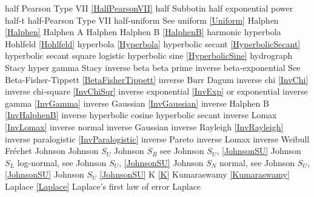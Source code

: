 half Pearson Type VII			\dotfill	\eqref{HalfPearsonVII} 				\ncite	%
half Subbotin					\dotfill	half exponential power				\ncite	%
half-t							\dotfill	half-Pearson Type VII				\ncite	%
half-uniform 					\dotfill	See uniform \eqref{Uniform} 			\ncite	%
Halphen							\dotfill	\eqref{Halphen}						\ncite
Halphen A						\dotfill	Halphen							\ncite
Halphen B						\dotfill	\eqref{HalphenB}					\ncite
harmonic						\dotfill	hyperbola							\ncite
Hohlfeld						\dotfill	\eqref{Hohlfeld}						\mcite{\self}	%
hyperbola						\dotfill	\eqref{Hyperbola}					\ncite	
hyperbolic secant 				\dotfill	\eqref{HyperbolicSecant}				\ncite	%
hyperbolic secant square		\dotfill	logistic 							\ncite	%
hyperbolic sine					\dotfill	\eqref{HyperbolicSine}				\mcite{\self}	%
hydrograph						\dotfill	Stacy 							\ncite	%
hyper gamma   					\dotfill	Stacy							\ncite	%
%
inverse beta					\dotfill	beta prime 						\ncite	%
inverse beta-exponential 		\dotfill	See Beta-Fisher-Tippett \eqref{BetaFisherTippett}\ncite
inverse Burr					\dotfill	Dagum 							\ncite	%
inverse chi  					\dotfill	\eqref{InvChi}						\ncite	%
inverse chi-square 				\dotfill	\eqref{InvChiSqr}					\ncite	%
inverse exponential 			\dotfill	\eqref{InvExp} or exponential			\ncite	%
inverse gamma 					\dotfill	\eqref{InvGamma}					\ncite	%
inverse Gaussian				\dotfill	\eqref{InvGaussian}					\ncite	%
inverse Halphen B				\dotfill	\eqref{InvHalphenB}					\ncite	
inverse hyperbolic cosine		\dotfill	hyperbolic secant 					\ncite	%
inverse Lomax					\dotfill	\eqref{InvLomax}					\ncite	%
inverse normal					\dotfill	inverse Gaussian					\ncite	%
inverse Rayleigh  				\dotfill	\eqref{InvRayleigh}					\ncite	%
inverse paralogistic			\dotfill	\eqref{InvParalogistic} 				\ncite	%
inverse Pareto					\dotfill	inverse Lomax 						\ncite 	%
inverse Weibull 				\dotfill	Fr\'{e}chet  						\ncite	%
%
Johnson							\dotfill	Johnson $S_U$								\ncite
Johnson $S_B$					\dotfill	see Johnson $S_U$, \eqref{JohnsonSU}	\ncite
Johnson $S_L$					\dotfill	log-normal, see Johnson $S_U$, \eqref{JohnsonSU}		\ncite
Johnson $S_N$					\dotfill	normal, see Johnson $S_U$, \eqref{JohnsonSU}			\ncite
Johnson $S_U$					\dotfill	\eqref{JohnsonSU}					\ncite
%
K								\dotfill	\eqref{K}							\ncite	%
Kumaraswamy						\dotfill	\eqref{Kumaraswamy} 				\ncite	%
%
Laplace							\dotfill	\eqref{Laplace} 						\ncite	%
Laplace's first law of error	\dotfill	Laplace 							\ncite	%
